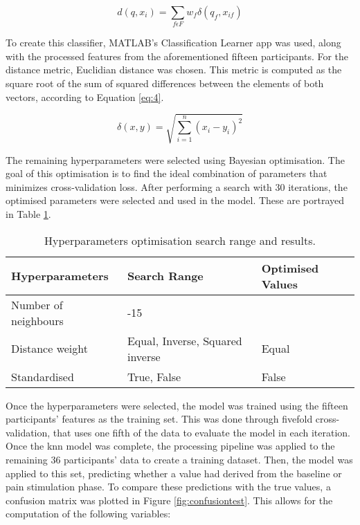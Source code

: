 \begin{equation} \label{eq:4}
d(q,x_i)=\sum_{f\epsilon F}^{}w_f\delta(q_f,x_{if})
\end{equation}



To create this classifier, MATLAB's Classification Learner app was used, along with the processed features from the aforementioned fifteen participants. For the distance metric, Euclidian distance was chosen. This metric is computed as the square root of the sum of squared differences between the elements of both vectors, according to Equation \ref{eq:4}.

\begin{equation} \label{eq:5}
\delta(x,y)=\sqrt{\sum_{i=1}^{n}(x_i-y_i)^2}
\end{equation}

The remaining hyperparameters were selected using Bayesian optimisation. The goal of this optimisation is to find the ideal combination of parameters that minimizes cross-validation loss. After performing a search with 30 iterations, the optimised parameters were selected and used in the model. These are portrayed in Table \ref{table:hyperparameters}. 

\begin{table}[h]
    \centering
    \captionsetup{justification=raggedright, singlelinecheck=false}
    \caption{Hyperparameters optimisation search range and results.}
    \renewcommand{\arraystretch}{1.2}

    \begingroup
    \sloppy
    \begin{tabular}{@{}>{\RaggedRight\arraybackslash}p{4.3cm} >{\RaggedRight\arraybackslash}p{5.7cm} >{\RaggedRight\arraybackslash}p{4cm}@{}}
        \hline
        \textbf{Hyperparameters} & \textbf{Search Range} & \textbf{Optimised Values} \\
        \midrule
        Number of neighbours & 1-15 & 2 \\
        [1ex]
        Distance weight & Equal, Inverse, Squared inverse & Equal \\
        [1ex]
        Standardised & True, False & False \\
    \end{tabular}
    \endgroup
    \label{table:hyperparameters}
\end{table}    



Once the hyperparameters were selected, the model was trained using the fifteen participants' features as the training set. This was done through fivefold cross-validation, that uses one fifth of the data to evaluate the model in each iteration. Once the \ac{knn} model was complete, the processing pipeline was applied to the remaining 36 participants' data to create a training dataset. Then, the model was applied to this set, predicting whether a value had derived from the baseline or pain stimulation phase. To compare these predictions with the true values, a confusion matrix was plotted in Figure \ref{fig:confusiontest}. This allows for the computation of the following variables:

